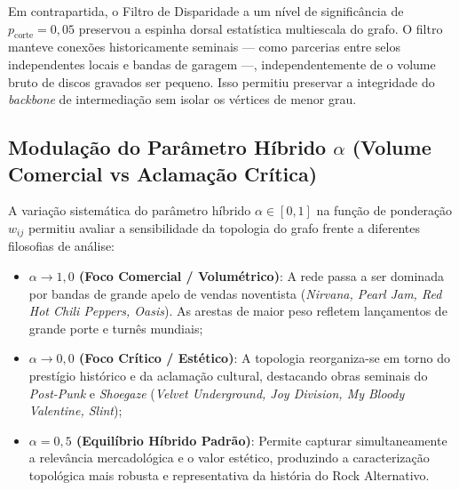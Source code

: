 \documentclass[conference]{IEEEtran}
\begin{document}
Em contrapartida, o Filtro de Disparidade a um nível de significância de $p_{\text{corte}} = 0,05$ preservou a espinha dorsal estatística multiescala do grafo. O filtro manteve conexões historicamente seminais — como parcerias entre selos independentes locais e bandas de garagem —, independentemente de o volume bruto de discos gravados ser pequeno. Isso permitiu preservar a integridade do \textit{backbone} de intermediação sem isolar os vértices de menor grau.

\subsection{Modulação do Parâmetro Híbrido $\alpha$ (Volume Comercial vs Aclamação Crítica)}
A variação sistemática do parâmetro híbrido $\alpha \in [0, 1]$ na função de ponderação $w_{ij}$ permitiu avaliar a sensibilidade da topologia do grafo frente a diferentes filosofias de análise:
\begin{itemize}
    \item \textbf{$\alpha \to 1,0$ (Foco Comercial / Volumétrico)}: A rede passa a ser dominada por bandas de grande apelo de vendas noventista (\textit{Nirvana, Pearl Jam, Red Hot Chili Peppers, Oasis}). As arestas de maior peso refletem lançamentos de grande porte e turnês mundiais;
    \item \textbf{$\alpha \to 0,0$ (Foco Crítico / Estético)}: A topologia reorganiza-se em torno do prestígio histórico e da aclamação cultural, destacando obras seminais do \textit{Post-Punk} e \textit{Shoegaze} (\textit{Velvet Underground, Joy Division, My Bloody Valentine, Slint});
    \item \textbf{$\alpha = 0,5$ (Equilíbrio Híbrido Padrão)}: Permite capturar simultaneamente a relevância mercadológica e o valor estético, produzindo a caracterização topológica mais robusta e representativa da história do Rock Alternativo.
\end{itemize}
\end{document}
